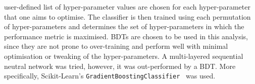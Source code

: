 user-defined list of hyper-parameter values are chosen for each hyper-parameter that one aims to optimise. The classifier is then trained using each permutation of hyper-parameters and determines the set of hyper-parameters in which the performance metric is maximised. BDTs are chosen to be used in this analysis, since they are not prone to over-training and perform well with minimal optimisation or tweaking of the hyper-parameters. A multi-layered sequential neutral network was tried, however, it was out-performed by a BDT. More specifically, Scikit-Learn's \texttt{GradientBoostingClassifier}~\cite{scikit-bdt} was used.
